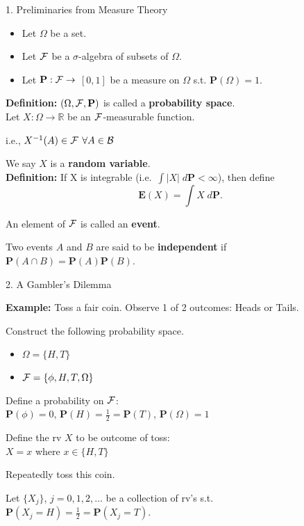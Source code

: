 \begin{frame}
\begin{center}
1. Preliminaries from Measure Theory
\end{center}

\begin{itemize}
\item Let $\Omega$ be a set.
\item Let $\cal{F}$ be a $\sigma$-algebra of subsets of $\Omega$.
\item Let $\textbf{P}:\cal{F} \rightarrow$ $[0, 1]$ be a measure on $\Omega$ s.t. $\textbf{P}(\Omega) =1$. 
\end{itemize}

\textbf{Definition:} $(\Omega, \cal{F}, \textbf{P})$ is called a \textbf{probability space}.\\

Let $X : \Omega \rightarrow \mathbb{R}$  be an $\cal{F}$-measurable function.

i.e., $X^{-1}(A) \in {\cal {F}}$ $\forall A \in \cal B$

We say $X$ is a \textbf{random variable}.\\

\textbf{Definition:} If X is integrable (i.e.\ $\int |X|\; d\textbf{P} < \infty$), then define 
$$\textbf{E}(X) = \int X\; d\textbf{P}.$$

An element of $\cal{F}$ is called an \textbf{event}.  

Two events $A$ and $B$ are said to be \textbf{independent} if $\textbf{P}(A \cap B) = \textbf{P}(A) \textbf{P}(B)$.
\end{frame}

\begin{frame}
\begin{center}
2. A Gambler's Dilemma
\end{center}

\textbf{Example:} Toss a fair coin. Observe 1 of 2 outcomes: Heads or Tails.

Construct the following probability space.

\begin{itemize}
\item $\Omega = \{H,T\}$
\item ${\cal F} = \{\phi, H, T, \Omega\}$
\end{itemize}

Define a probability on $\cal{F}$:\\
$\textbf{P}(\phi)=0$, $\textbf{P}(H) = \frac{1}{2} = \textbf{P}(T)$, $\textbf{P}(\Omega)=1$

Define the rv $X$ to be outcome of toss:\\
$X=x$ where $x \in \{H,T\}$

Repeatedly toss this coin.  

Let $\{X_{j}\}$, $j = 0,1,2,\dots$ be a collection of rv's s.t. $\textbf{P}(X_{j}=H) = \frac{1}{2} = \textbf{P}(X_{j}=T)$.

\end{frame}